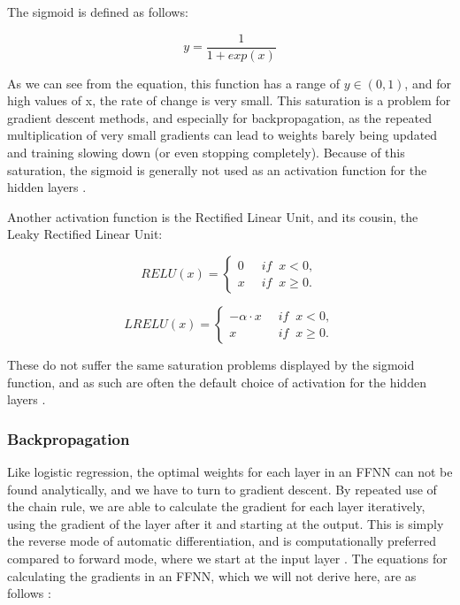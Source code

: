 \documentclass[onecolumn,10pt,cleanfoot]{asme2ej}
\begin{document}
The sigmoid is defined as follows:

\begin{equation}
y = \frac{1}{1 + exp(x)}
\end{equation}

As we can see from the equation, this function has a range of $y \in (0,1)$, and for high values of x, the rate of change is very small. This saturation is a problem for gradient descent methods, and especially for backpropagation, as the repeated multiplication of very small gradients can lead to weights barely being updated and training slowing down (or even stopping completely). Because of this saturation, the sigmoid is generally not used as an activation function for the hidden layers \cite[191]{gbc}.

Another activation function is the Rectified Linear Unit, and its cousin, the Leaky Rectified Linear Unit:

\begin{equation}
RELU(x) = \left\{\begin{array}{cc} 0 & \; \; if \; \; x < 0, \\  x & \; \; if \; \; x \ge 0.\end{array}\right.
\end{equation}

\begin{equation}
LRELU(x) = \left\{\begin{array}{cc} -\alpha \cdot x & \; \; if \; \; x < 0, \\  x & \; \; if \; \; x \ge 0.\end{array}\right.
\end{equation}

These do not suffer the same saturation problems displayed by the sigmoid function, and as such are often the default choice of activation for the hidden layers \cite[188]{gbc}.

\subsubsection{Backpropagation}

Like logistic regression, the optimal weights for each layer in an FFNN can not be found analytically, and we have to turn to gradient descent. By repeated use of the chain rule, we are able to calculate the gradient for each layer iteratively, using the gradient of the layer after it and starting at the output. This is simply the reverse mode of automatic differentiation, and is computationally preferred compared to forward mode, where we start at the input layer \cite[416]{sr}. The equations for calculating the gradients in an FFNN, which we will not derive here, are as follows \cite{morten}:
\end{document}
